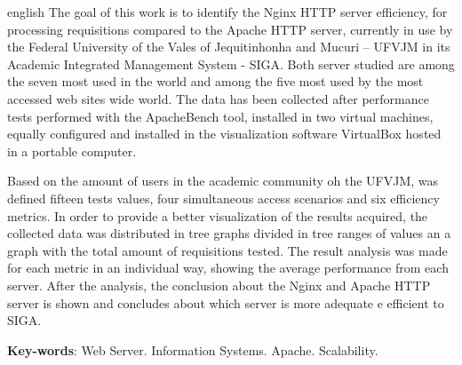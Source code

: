 \begin{resumo}[Abstract]
 \begin{otherlanguage*}{english}
The goal of this work is to identify the Nginx HTTP server efficiency, for 
processing requisitions compared to the Apache HTTP server, currently in use by 
the Federal University of the Vales of Jequitinhonha and Mucuri – UFVJM in its 
Academic Integrated Management System - SIGA. Both server studied are among the 
seven most used in the world and among the five most used by the most accessed 
web sites wide world. The data has been collected after performance tests 
performed with the ApacheBench tool, installed in two virtual machines, equally 
configured and installed in the visualization software VirtualBox hosted in a 
portable computer.

Based on the amount of users in the academic community oh the UFVJM, was 
defined fifteen tests values, four simultaneous access scenarios and six 
efficiency metrics. In order to provide a better visualization of the results 
acquired, the collected data was distributed in tree graphs divided in tree 
ranges of values an a graph with the total amount of requisitions tested. The 
result analysis was made for each metric in an individual way, showing the 
average performance from each server. After the analysis, the conclusion about 
the Nginx and Apache HTTP server is shown and concludes about which server is 
more adequate e efficient to SIGA.
   \vspace{\onelineskip}
 
   \noindent 
   \textbf{Key-words}: Web Server. Information Systems. Apache. Scalability.
 \end{otherlanguage*}
\end{resumo}